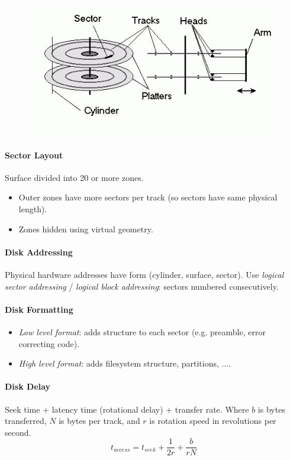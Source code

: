 \documentclass[twocolumn,english]{article}
\begin{document}
\begin{figure}[H]
\centering{}\includegraphics[width=0.4\linewidth]{img/disk}
\end{figure}

\paragraph{Sector Layout}

Surface divided into 20 or more zones.
\begin{itemize}
\item Outer zones have more sectors per track (so sectors have same physical
length).
\item Zones hidden using virtual geometry.
\end{itemize}

\paragraph{Disk Addressing}

Physical hardware addresses have form (cylinder, surface, sector).
Use \emph{logical sector addressing} / \emph{logical block addressing}:
sectors numbered consecutively.

\paragraph{Disk Formatting}
\begin{itemize}
\item \emph{Low level format}: adds structure to each sector (e.g. preamble,
error correcting code).
\item \emph{High level format}: adds filesystem structure, partitions, ....
\end{itemize}

\paragraph{Disk Delay}

Seek time + latency time (rotational delay) + transfer rate. Where
$b$ is bytes transferred, $N$ is bytes per track, and $r$ is rotation
speed in revolutions per second.
\[
t_{access}=t_{seek}+\frac{1}{2r}+\frac{b}{rN}
\]
\end{document}
